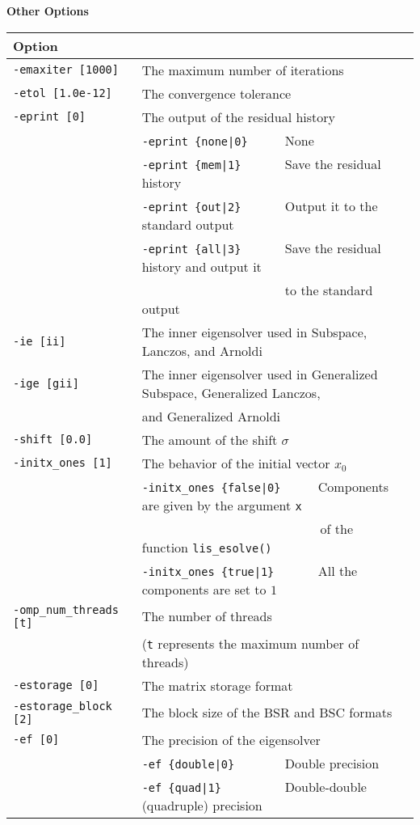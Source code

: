 \documentclass[a4paper]{article}
\begin{document}
\begin{minipage}[t]{\textwidth}
\begin{center}
{\bf Other Options}\\
\begin{tabular}{l|ll}\hline\hline
Option &                          \\ \hline
\verb=-emaxiter [1000]= & The maximum number of iterations         \\ 
\verb=-etol [1.0e-12]=  & The convergence tolerance          \\
\verb=-eprint [0]=      & The output of the residual history                \\
                       & \verb=-eprint {none|0}     =  None \\
                       & \verb=-eprint {mem|1}      =  Save the residual history\\
                       & \verb=-eprint {out|2}      =  Output it to the standard output\\
                       & \verb=-eprint {all|3}      =  Save the residual history and output it \\
                       & \verb=                     =  to the standard output\\
\verb=-ie [ii]= & The inner eigensolver used in Subspace, Lanczos, and Arnoldi\\
\verb=-ige [gii]= & The inner eigensolver used in Generalized Subspace, Generalized Lanczos, \\
                       & and Generalized Arnoldi\\
\verb=-shift [0.0]= & The amount of the shift $\sigma$ \\
\verb=-initx_ones [1]= & The behavior of the initial vector $x_{0}$  \\
                       & \verb=-initx_ones {false|0}     =  Components are given by the argument \verb=x= \\
                       & \verb=                           =  of the function \verb=lis_esolve()= \\
                       & \verb=-initx_ones {true|1}      =  All the components are set to $1$ \\
\verb=-omp_num_threads [t]= & The number of threads        \\ 
                            & (\verb=t= represents the maximum number of
 threads) \\
\verb=-estorage [0]=   & The matrix storage format \\
\verb=-estorage_block [2]=& The block size of the BSR and BSC formats\\ 
\verb=-ef [0]=         & The precision of the eigensolver\\
                       & \verb=-ef {double|0}       =  Double precision \\ 
                       & \verb=-ef {quad|1}         =  Double-double (quadruple) precision \\
\hline         
\end{tabular}
\end{center}
\end{minipage}
\end{document}
